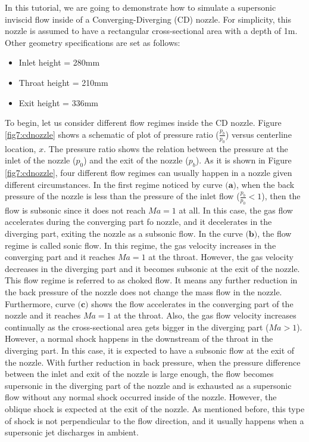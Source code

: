 In this tutorial, we are going to demonstrate how to simulate a supersonic inviscid flow inside of a Converging-Diverging (CD) nozzle. For simplicity, this nozzle is assumed to have a rectangular cross-sectional area with a depth of 1m. Other geometry specifications are set as follows: 
\begin{itemize}
	\item Inlet height = 280mm
	\item Throat height = 210mm 
	\item Exit height = 336mm
\end{itemize}
To begin, let us consider different flow regimes inside the CD nozzle. Figure \ref{fig7:cdnozzle} shows a schematic of plot of pressure ratio ($\frac{p_{b}}{p_{0}}$) versus centerline location, $x$. The pressure ratio shows the relation between the pressure at the inlet of the nozzle ($p_{0}$) and the exit of the nozzle ($p_{b}$). As it is shown in Figure \ref{fig7:cdnozzle}, four different flow regimes can usually happen in a nozzle given different circumstances. In the first regime noticed by curve $\textbf{(a)}$, when the back pressure of the nozzle is less than the pressure of the inlet flow ($\frac{p_{b}}{p_{0}}<1$), then the flow is subsonic since it does not reach $Ma=1$ at all. In this case, the gas flow accelerates during the converging part fo nozzle, and it decelerates in the diverging part, exiting the nozzle as a subsonic flow. In the curve $\textbf{(b)}$, the flow regime is called sonic flow. In this regime, the gas velocity increases in the converging part and it reaches $Ma=1$ at the throat. However, the gas velocity decreases in the diverging part and it becomes subsonic at the exit of the nozzle. This flow regime is referred to as choked flow. It means any further reduction in the back pressure of the nozzle does not change the mass flow in the nozzle. Furthermore, curve $\textbf{(c)}$ shows the flow accelerates in the converging part of the nozzle and it reaches $Ma=1$ at the throat. Also, the gas flow velocity increases continually as the cross-sectional area gets bigger in the diverging part ($Ma>1$). However, a normal shock happens in the downstream of the throat in the diverging part. In this case, it is expected to have a subsonic flow at the exit of the nozzle.
With further reduction in back pressure, when the pressure difference between the inlet and exit of the nozzle is large enough, the flow becomes supersonic in the diverging part of the nozzle and is exhausted as a supersonic flow without any normal shock occurred inside of the nozzle. However, the oblique shock is expected at the exit of the nozzle. As mentioned before, this type of shock is not perpendicular to the flow direction, and it usually happens when a supersonic jet discharges in ambient.
